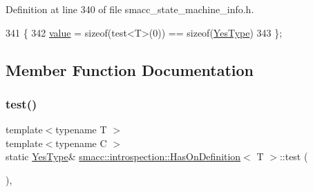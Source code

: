 Definition at line 340 of file smacc\+\_\+state\+\_\+machine\+\_\+info.\+h.


\begin{DoxyCode}
341     \{
342         \hyperlink{classsmacc_1_1introspection_1_1HasOnDefinition_ab40a368fd2564562bf0107984f5f197da2c667ca4893ef31062bc9864e4d06ab2}{value} = \textcolor{keyword}{sizeof}(test<T>(0)) == \textcolor{keyword}{sizeof}(\hyperlink{classsmacc_1_1introspection_1_1HasOnDefinition_ad18cda8f47c5a0e9660b7c7ca54d98c7}{YesType})
343     \};
\end{DoxyCode}


\subsection{Member Function Documentation}
\mbox{\label{classsmacc_1_1introspection_1_1HasOnDefinition_a9271922a017eed3dc8d9ef931239ca3d}} 
\subsubsection{\texorpdfstring{test()}{test()}\hspace{0.1cm}{\footnotesize\ttfamily [1/2]}}
{\footnotesize\ttfamily template$<$typename T $>$ \\
template$<$typename C $>$ \\
static \hyperlink{classsmacc_1_1introspection_1_1HasOnDefinition_ad18cda8f47c5a0e9660b7c7ca54d98c7}{Yes\+Type}\& \hyperlink{classsmacc_1_1introspection_1_1HasOnDefinition}{smacc\+::introspection\+::\+Has\+On\+Definition}$<$ T $>$\+::test (\begin{DoxyParamCaption}\item[{decltype \&\+::static\+Configure}]{ }\end{DoxyParamCaption})\hspace{0.3cm}{\ttfamily [static]}, {\ttfamily [private]}}

\mbox{\label{classsmacc_1_1introspection_1_1HasOnDefinition_a22cbbab4a5ce8f1b85cfd98a374f7f49}} 
